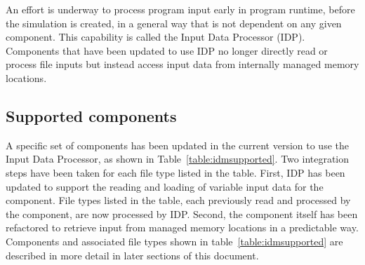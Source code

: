 An effort is underway to process program input early in program runtime, before the simulation is created, in a general way that is not dependent on any given component.  This capability is called the \mf Input Data Processor (IDP).  Components that have been updated to use IDP no longer directly read or process file inputs but instead access input data from internally managed memory locations. 

\subsection{Supported components}

A specific set of \mf components has been updated in the current version to use the Input Data Processor, as shown in Table~\ref{table:idmsupported}.  Two integration steps have been taken for each file type listed in the table.  First, IDP has been updated to support the reading and loading of variable input data for the component.  File types listed in the table, each previously read and processed by the component, are now processed by IDP.  Second, the component itself has been refactored to retrieve input from managed memory locations in a predictable way.  Components and associated file types shown in table~\ref{table:idmsupported} are described in more detail in later sections of this document.

